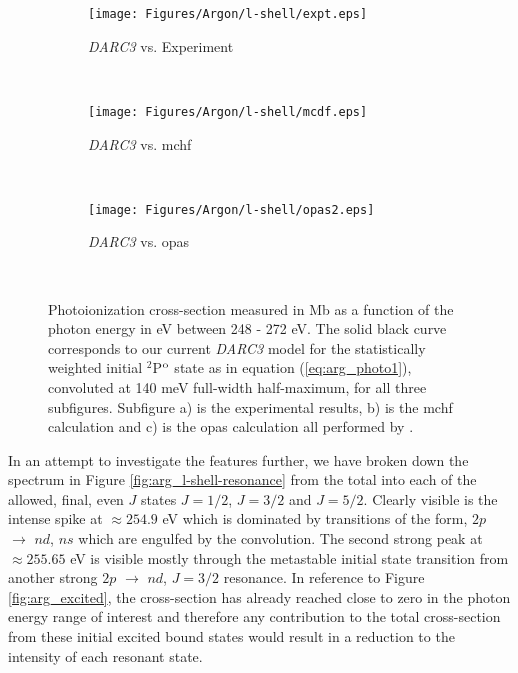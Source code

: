 \begin{figure}
    \centering
    \begin{subfigure}[b]{0.9\textwidth}
\texttt{[image: Figures/Argon/l-shell/expt.eps]}
        \caption{\textit{DARC3} vs. Experiment}
        \label{subfig:arg_7}
    \end{subfigure}
    ~ %
    \\
    \begin{subfigure}[b]{0.9\textwidth}
\texttt{[image: Figures/Argon/l-shell/mcdf.eps]}
        \caption{\textit{DARC3} vs. {\sc mchf}}
        \label{subfig:arg_8}
    \end{subfigure}
    ~ %
    \\
        \begin{subfigure}[b]{0.9\textwidth}
\texttt{[image: Figures/Argon/l-shell/opas2.eps]}
        \caption{\textit{DARC3} vs. {\sc opas}}
        \label{subfig:arg_9}
    \end{subfigure}
    ~ %
    \caption{Photoionization cross-section measured in Mb as a function of the photon energy in eV between 248 - 272 eV. The solid black curve corresponds to our current \textit{DARC3} model for the statistically weighted initial $^2$P$^{{\rm o}}$ state as in equation (\ref{eq:arg_photo1}), convoluted at 140 meV full-width half-maximum, for all three subfigures. Subfigure a) is the experimental results, b) is the {\sc mchf} calculation and c) is the {\sc opas} calculation all performed by \citet{2012PhRvA..85d3408B}. \label{fig:arg_l-shell-big}}
\end{figure}

In an attempt to investigate the features further, we have broken down the spectrum in Figure \ref{fig:arg_l-shell-resonance} from the total into each of the allowed, final, even $J$ states $J=1/2$, $J=3/2$ and $J=5/2$. Clearly visible is the intense spike at $\approx 254.9$ eV which is dominated by transitions of the form, $2p$ $\rightarrow$ $nd$, $ns$ which are engulfed by the convolution. The second strong peak at $\approx 255.65$ eV is visible mostly through the metastable initial state transition from another strong $2p$ $\rightarrow$ $nd$, $J = 3/2$ resonance. In reference to Figure \ref{fig:arg_excited}, the cross-section has already reached close to zero in the photon energy range of interest and therefore any contribution to the total cross-section from these initial excited bound states would result in a reduction to the intensity of each resonant state. 

